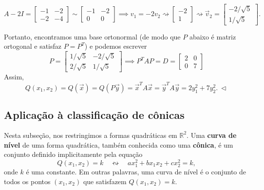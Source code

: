 \begin{ex}
\begin{itemize}
		\begin{equation}
		A -2I =
		\begin{bmatrix}
		-1 & -2 \\
		-2 &  -4
		\end{bmatrix} \sim
		\begin{bmatrix}
		-1 & -2 \\
		0 &  0
		\end{bmatrix} \implies v_1 = -2v_2 \rightsquigarrow
		\begin{bmatrix}
		-2 \\ 1
		\end{bmatrix} \rightsquigarrow
		\vec{v}_2 = \begin{bmatrix}
		-2/\sqrt{5} \\ 1/\sqrt{5}
		\end{bmatrix} .
		\end{equation}
	\end{itemize}  Portanto, encontramos uma base ortonormal (de modo que $P$ abaixo é matriz ortogonal e satisfaz $P = P^T$) e podemos escrever
	\begin{equation}
	P =
	\begin{bmatrix}
	1/\sqrt{5} & -2/\sqrt{5} \\
	2/\sqrt{5} & 1/\sqrt{5}
	\end{bmatrix} \implies P^T A P = D =
	\begin{bmatrix}
	2 & 0 \\ 0 & 7
	\end{bmatrix}
	\end{equation} Assim,
	\begin{equation}
	Q(x_1, x_2) = Q (\vec{x}) = Q (P\vec{y}) = \vec{x}^T A \vec{x} = \vec{y}^T A \vec{y} =  2 y_1^2 + 7 y_2^2. \ \lhd
	\end{equation}
\end{ex}



\subsection{Aplicação à classificação de cônicas}

Nesta subseção, nos restringimos a formas quadráticas em $\mathbb{R}^2$. Uma \textbf{curva de nível} de uma forma quadrática, também conhecida como uma \textbf{cônica}, é um conjunto definido implicitamente pela equação
\begin{equation}
Q(x_1, x_2) = k \quad \leftrightsquigarrow \quad ax_1^2 + bx_1x_2 + cx_2^2 = k,
\end{equation} onde $k$ é uma constante. Em outras palavras, uma curva de nível é o conjunto de todos os pontos $(x_1, x_2)$ que satisfazem $Q(x_1, x_2) = k$.


